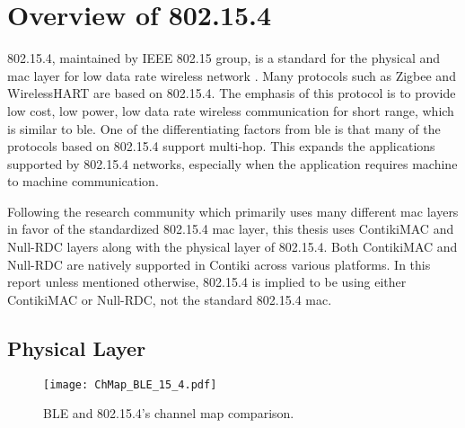 

\section{Overview of 802.15.4} \label{Overview15.4}
802.15.4, maintained by IEEE 802.15 group, is a standard for the physical and \gls{mac} layer for low data rate wireless network \cite{IEEE802154}. Many protocols such as Zigbee and WirelessHART are based on 802.15.4. The emphasis of this protocol is to provide low cost, low power, low data rate wireless communication for short range, which is similar to \gls{ble}. One of the differentiating factors from \gls{ble} is that many of the protocols based on 802.15.4 support multi-hop. This expands the applications supported by 802.15.4 networks, especially when the application requires machine to machine communication.

Following the research community which primarily uses many different \gls{mac} layers in favor of the standardized 802.15.4 \gls{mac} layer, this thesis uses ContikiMAC and Null-RDC layers along with the physical layer of 802.15.4. Both ContikiMAC and Null-RDC are natively supported in Contiki across various platforms. In this report unless mentioned otherwise, 802.15.4 is implied to be using either ContikiMAC or Null-RDC, not the standard 802.15.4 \gls{mac}.

\subsection{Physical Layer}
\begin{figure}[h]
\centering
\texttt{[image: ChMap\_BLE\_15\_4.pdf]}
\caption{BLE and 802.15.4's channel map comparison.}
\label{fig:ChMap}
\end{figure}

